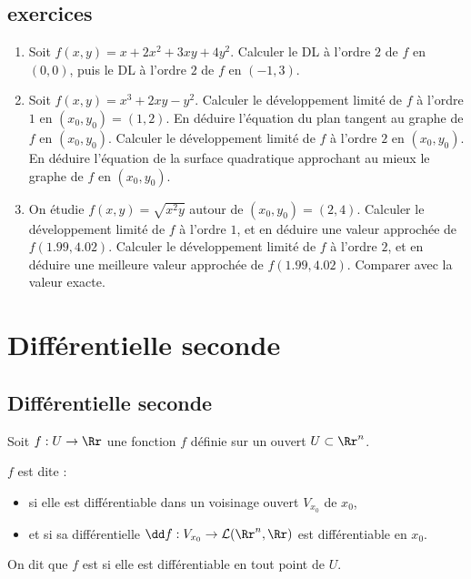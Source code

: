 \subsection{exercices}

\begin{enumerate}
     \item Soit $f(x,y) = x + 2x^2 + 3xy + 4y^2$. Calculer le DL à l'ordre $2$ de $f$ en $(0,0)$, puis le DL à l'ordre $2$ de $f$ en $(-1,3)$.

    \item Soit $f(x,y) = x^3  +2xy - y^2$. Calculer le développement limité de $f$ à l'ordre $1$ en $(x_0,y_0)=(1,2)$. En déduire l'équation du plan tangent au graphe de $f$ en $(x_0,y_0)$. Calculer le développement limité de $f$ à l'ordre $2$ en $(x_0,y_0)$. En déduire l'équation de la surface quadratique approchant au mieux le graphe de $f$ en $(x_0,y_0)$. 

    \item On étudie $f(x,y) = \sqrt{x^2y}$ autour de $(x_0,y_0)= (2,4)$.
   Calculer le développement limité de $f$ à l'ordre $1$, et en déduire une valeur approchée de $f(1.99,4.02)$. Calculer le développement limité de $f$ à l'ordre $2$, et en déduire une meilleure valeur approchée de $f(1.99,4.02)$. Comparer avec la valeur exacte.
 
\end{enumerate}



\section{Différentielle seconde}


\subsection{Différentielle seconde}


Soit $f : U \to \Rr$ une fonction $f$ définie sur un ouvert $U \subset \Rr^n$.
\begin{definition}{}{}
$f$ est dite  :
    \begin{itemize}
        \item si elle est différentiable dans un voisinage ouvert $V_{x_0}$ de $x_0$,
        \item et si sa différentielle $\dd f : V_{x_0} \to \mathcal{L}(\Rr^n,\Rr)$ est différentiable en $x_0$.
    \end{itemize}
    On dit que $f$ est  si elle est différentiable en tout point de $U$.
\end{definition} 


